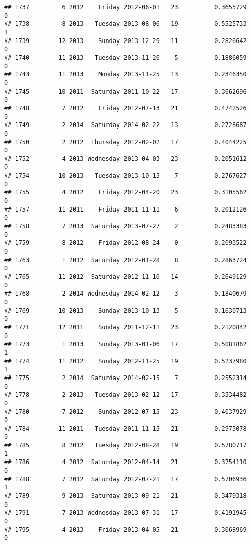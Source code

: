 \documentclass[
]{article}
\begin{document}
\begin{verbatim}
## 1737         6 2012    Friday 2012-06-01   23          0.3655729             0
## 1738         8 2013   Tuesday 2013-08-06   19          0.5525733             1
## 1739        12 2013    Sunday 2013-12-29   11          0.2826642             0
## 1740        11 2013   Tuesday 2013-11-26    5          0.1886059             0
## 1743        11 2013    Monday 2013-11-25   13          0.2346350             0
## 1745        10 2011  Saturday 2011-10-22   17          0.3662696             0
## 1748         7 2012    Friday 2012-07-13   21          0.4742526             0
## 1749         2 2014  Saturday 2014-02-22   13          0.2728687             0
## 1750         2 2012  Thursday 2012-02-02   17          0.4044225             0
## 1752         4 2013 Wednesday 2013-04-03   23          0.2051612             0
## 1754        10 2013   Tuesday 2013-10-15    7          0.2767627             0
## 1755         4 2012    Friday 2012-04-20   23          0.3105562             0
## 1757        11 2011    Friday 2011-11-11    6          0.2012126             0
## 1758         7 2013  Saturday 2013-07-27    2          0.2483383             0
## 1759         8 2012    Friday 2012-08-24    0          0.2093522             0
## 1763         1 2012  Saturday 2012-01-28    8          0.2863724             0
## 1765        11 2012  Saturday 2012-11-10   14          0.2649129             0
## 1768         2 2014 Wednesday 2014-02-12    3          0.1840679             0
## 1769        10 2013    Sunday 2013-10-13    5          0.1630713             0
## 1771        12 2011    Sunday 2011-12-11   23          0.2120842             0
## 1773         1 2013    Sunday 2013-01-06   17          0.5081862             1
## 1774        11 2012    Sunday 2012-11-25   19          0.5237980             1
## 1775         2 2014  Saturday 2014-02-15    7          0.2552314             0
## 1778         2 2013   Tuesday 2013-02-12   17          0.3534482             0
## 1780         7 2012    Sunday 2012-07-15   23          0.4037929             0
## 1784        11 2011   Tuesday 2011-11-15   21          0.2975078             0
## 1785         8 2012   Tuesday 2012-08-28   19          0.5780717             1
## 1786         4 2012  Saturday 2012-04-14   21          0.3754110             0
## 1788         7 2012  Saturday 2012-07-21   17          0.5706936             1
## 1789         9 2013  Saturday 2013-09-21   21          0.3479318             0
## 1791         7 2013 Wednesday 2013-07-31   17          0.4191945             0
## 1795         4 2013    Friday 2013-04-05   21          0.3068969             0

\end{verbatim}
\end{document}
